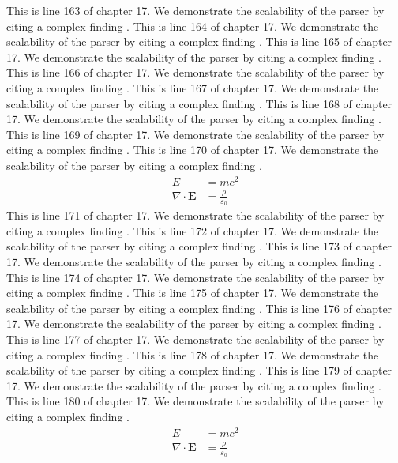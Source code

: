 This is line 163 of chapter 17. We demonstrate the scalability of the parser by citing a complex finding \cite{ref17_163}.
This is line 164 of chapter 17. We demonstrate the scalability of the parser by citing a complex finding \cite{ref17_164}.
This is line 165 of chapter 17. We demonstrate the scalability of the parser by citing a complex finding \cite{ref17_165}.
This is line 166 of chapter 17. We demonstrate the scalability of the parser by citing a complex finding \cite{ref17_166}.
This is line 167 of chapter 17. We demonstrate the scalability of the parser by citing a complex finding \cite{ref17_167}.
This is line 168 of chapter 17. We demonstrate the scalability of the parser by citing a complex finding \cite{ref17_168}.
This is line 169 of chapter 17. We demonstrate the scalability of the parser by citing a complex finding \cite{ref17_169}.
This is line 170 of chapter 17. We demonstrate the scalability of the parser by citing a complex finding \cite{ref17_170}.
\begin{align*}
  E &= mc^2 \\
  \nabla \cdot \mathbf{E} &= \frac{\rho}{\varepsilon_0}
\end{align*}
This is line 171 of chapter 17. We demonstrate the scalability of the parser by citing a complex finding \cite{ref17_171}.
This is line 172 of chapter 17. We demonstrate the scalability of the parser by citing a complex finding \cite{ref17_172}.
This is line 173 of chapter 17. We demonstrate the scalability of the parser by citing a complex finding \cite{ref17_173}.
This is line 174 of chapter 17. We demonstrate the scalability of the parser by citing a complex finding \cite{ref17_174}.
This is line 175 of chapter 17. We demonstrate the scalability of the parser by citing a complex finding \cite{ref17_175}.
This is line 176 of chapter 17. We demonstrate the scalability of the parser by citing a complex finding \cite{ref17_176}.
This is line 177 of chapter 17. We demonstrate the scalability of the parser by citing a complex finding \cite{ref17_177}.
This is line 178 of chapter 17. We demonstrate the scalability of the parser by citing a complex finding \cite{ref17_178}.
This is line 179 of chapter 17. We demonstrate the scalability of the parser by citing a complex finding \cite{ref17_179}.
This is line 180 of chapter 17. We demonstrate the scalability of the parser by citing a complex finding \cite{ref17_180}.
\begin{align*}
  E &= mc^2 \\
  \nabla \cdot \mathbf{E} &= \frac{\rho}{\varepsilon_0}
\end{align*}
